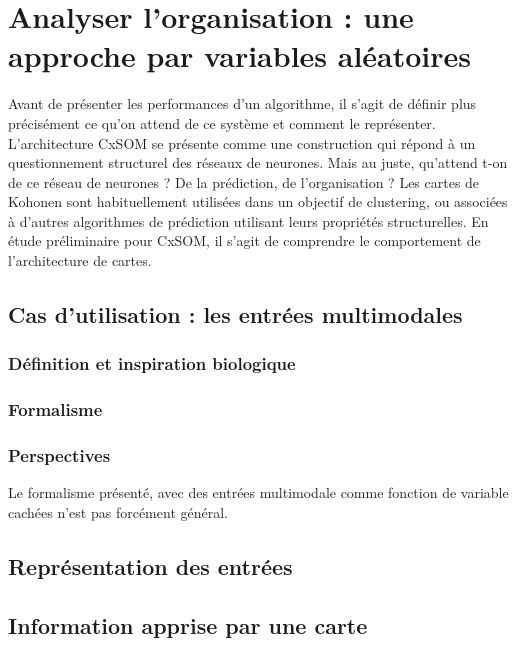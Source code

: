 \chapter{Analyser l'organisation : une approche par variables aléatoires}

Avant de présenter les performances d'un algorithme, il s'agit de définir plus précisément ce qu'on attend de ce système et comment le représenter. L'architecture CxSOM se présente comme une construction qui répond à un questionnement structurel des réseaux de neurones. Mais au juste, qu'attend t-on de ce réseau de neurones ? De la prédiction, de l'organisation ? Les cartes de Kohonen sont habituellement utilisées dans un objectif de clustering, ou associées à d'autres algorithmes de prédiction utilisant leurs propriétés structurelles. En étude préliminaire pour CxSOM, il s'agit de comprendre le comportement de l'architecture de cartes.

\section{Cas d'utilisation : les entrées multimodales}



\subsection{Définition et inspiration biologique}

\subsection{Formalisme}


\subsection{Perspectives}

Le formalisme présenté, avec des entrées multimodale comme fonction de variable cachées n'est pas forcément général.  

\section{Représentation des entrées}


\section{Information apprise par une carte}

